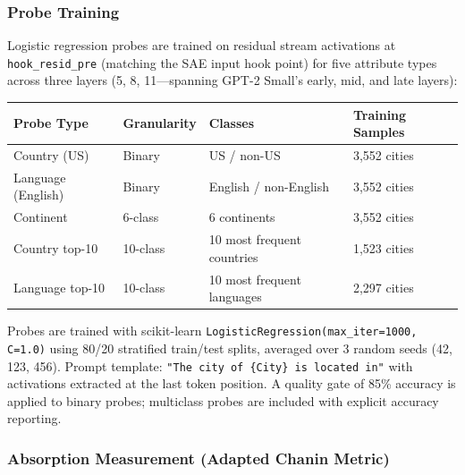 \documentclass{article}
\begin{document}
\subsubsection{Probe Training}

Logistic regression probes are trained on residual stream activations at \texttt{hook\_resid\_pre} (matching the SAE input hook point) for five attribute types across three layers (5, 8, 11---spanning GPT-2 Small's early, mid, and late layers):

\begin{table}[h]
\centering
\small
\begin{tabular}{@{}llll@{}}
\toprule
Probe Type & Granularity & Classes & Training Samples \\
\midrule
Country (US) & Binary & US / non-US & 3,552 cities \\
Language (English) & Binary & English / non-English & 3,552 cities \\
Continent & 6-class & 6 continents & 3,552 cities \\
Country top-10 & 10-class & 10 most frequent countries & 1,523 cities \\
Language top-10 & 10-class & 10 most frequent languages & 2,297 cities \\
\bottomrule
\end{tabular}
\end{table}

Probes are trained with scikit-learn \texttt{LogisticRegression(max\_iter=1000, C=1.0)} using 80/20 stratified train/test splits, averaged over 3 random seeds (42, 123, 456).
Prompt template: \texttt{"The city of \{City\} is located in"} with activations extracted at the last token position.
A quality gate of 85\% accuracy is applied to binary probes; multiclass probes are included with explicit accuracy reporting.

\subsubsection{Absorption Measurement (Adapted Chanin Metric)}
\end{document}
